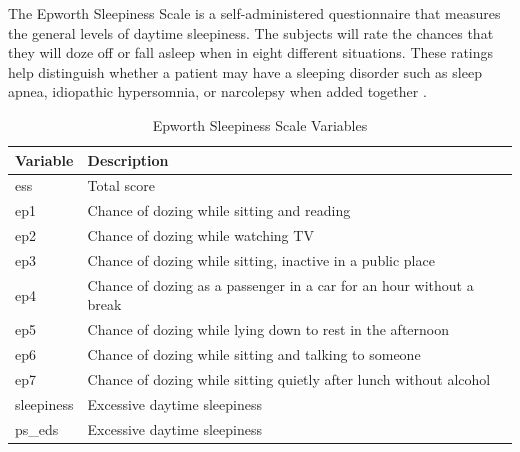 \documentclass[10pt,conference,a4paper]{IEEEtran}
\begin{document}
The Epworth Sleepiness Scale is a self-administered questionnaire that measures the general levels of daytime sleepiness. The subjects will rate the chances that they will doze off or fall asleep when in eight different situations. These ratings help distinguish whether a patient may have a sleeping disorder such as sleep apnea, idiopathic hypersomnia, or narcolepsy when added together \cite{Johns1991}.
\begin{table}[H]
\begin{tabular}{@{}p{}p{}@{}}
\toprule
Variable                        & Description                                                          \\ \midrule
\multicolumn{1}{l|}{ess}        & Total score                                                          \\
\multicolumn{1}{l|}{ep1}        & Chance of dozing while sitting and reading                           \\
\multicolumn{1}{l|}{ep2}        & Chance of dozing while watching TV                                   \\
\multicolumn{1}{l|}{ep3}        & Chance of dozing while sitting, inactive in a public place           \\
\multicolumn{1}{l|}{ep4}        & Chance of dozing as a passenger in a car for an hour without a break \\
\multicolumn{1}{l|}{ep5}        & Chance of dozing while lying down to rest in the afternoon           \\
\multicolumn{1}{l|}{ep6}        & Chance of dozing while sitting and talking to someone                \\
\multicolumn{1}{l|}{ep7}        & Chance of dozing while sitting quietly after lunch without alcohol   \\
\multicolumn{1}{l|}{sleepiness} & Excessive daytime sleepiness                                         \\
\multicolumn{1}{l|}{ps\_eds}    & Excessive daytime sleepiness                                         \\ \bottomrule
\end{tabular}
\caption{Epworth Sleepiness Scale Variables}
\end{table}
\end{document}

